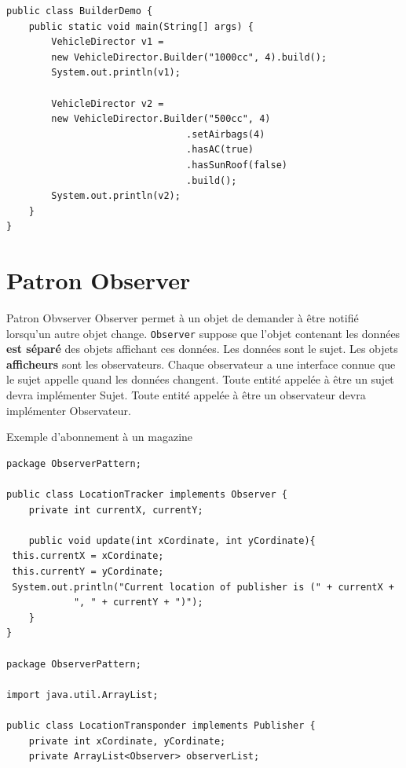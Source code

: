 \documentclass[16pt]{report}
\begin{document}
\begin{multicols*}{2}
\begin{lstlisting}[style=JavaDraculaWhite]
public class BuilderDemo {
    public static void main(String[] args) {
        VehicleDirector v1 = 
        new VehicleDirector.Builder("1000cc", 4).build();
        System.out.println(v1);

        VehicleDirector v2 = 
        new VehicleDirector.Builder("500cc", 4)
                                .setAirbags(4)
                                .hasAC(true)
                                .hasSunRoof(false)
                                .build();
        System.out.println(v2);
    }
}
\end{lstlisting}
        
    \section{Patron Observer}

    \begin{Concept}{Patron Obvserver}{}
        Observer permet à un objet de demander à être notifié lorsqu’un autre
        objet change. \texttt{Observer} suppose que l’objet contenant les données 
        \textbf{est séparé} des objets affichant ces données. Les données sont le 
        \textcolor{myb}{sujet}. Les objets \textbf{afficheurs} sont les \textcolor{myb}{observateurs}. 
        Chaque observateur a une interface connue que le sujet appelle quand les données changent. 
        Toute entité appelée à être un sujet devra implémenter Sujet. 
        Toute entité appelée à être un observateur devra implémenter Observateur.
    \end{Concept}       


    \begin{EExample}{Exemple d'abonnement à un magazine}{}

\begin{lstlisting}[style=JavaDraculaWhite]
package ObserverPattern;

public class LocationTracker implements Observer {
    private int currentX, currentY;
  
    public void update(int xCordinate, int yCordinate){
 this.currentX = xCordinate;
 this.currentY = yCordinate;
 System.out.println("Current location of publisher is (" + currentX +
            ", " + currentY + ")");
    }
}

package ObserverPattern;

import java.util.ArrayList;

public class LocationTransponder implements Publisher {
    private int xCordinate, yCordinate;
    private ArrayList<Observer> observerList;
  

\end{lstlisting}
\end{EExample}
\end{multicols*}
\end{document}
